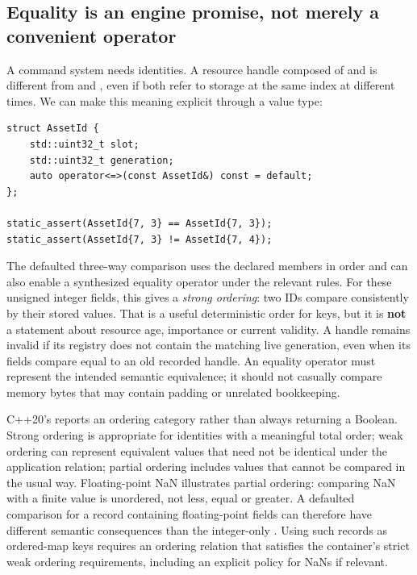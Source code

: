 \subsection{Equality is an engine promise, not merely a convenient operator}\label{05-engine-i-ch004-equality-is-an-engine-promise-not-merely-a-convenient-operator}

\hypertarget{05-engine-i-ch004-equality-is-an-engine-promise-not-merely-a-convenient-operator}{}

A command system needs identities. A resource handle composed of  and  is different from  and , even if both refer to storage at the same index at different times. We can make this meaning explicit through a value type:

\begin{verbatim}
struct AssetId {
    std::uint32_t slot;
    std::uint32_t generation;
    auto operator<=>(const AssetId&) const = default;
};

static_assert(AssetId{7, 3} == AssetId{7, 3});
static_assert(AssetId{7, 3} != AssetId{7, 4});
\end{verbatim}

The defaulted three-way comparison uses the declared members in order and can also enable a synthesized equality operator under the relevant rules. For these unsigned integer fields, this gives a \emph{strong ordering}: two IDs compare consistently by their stored values. That is a useful deterministic order for keys, but it is \textbf{not} a statement about resource age, importance or current validity. A handle remains invalid if its registry does not contain the matching live generation, even when its fields compare equal to an old recorded handle. An equality operator must represent the intended semantic equivalence; it should not casually compare memory bytes that may contain padding or unrelated bookkeeping.

C++20's \BookInlineCode{{\textless{}}{=}{\textgreater{}}}{\textless{}=\textgreater{}} reports an ordering category rather than always returning a Boolean. Strong ordering is appropriate for identities with a meaningful total order; weak ordering can represent equivalent values that need not be identical under the application relation; partial ordering includes values that cannot be compared in the usual way. Floating-point NaN illustrates partial ordering: comparing NaN with a finite value is unordered, not less, equal or greater. A defaulted comparison for a record containing floating-point fields can therefore have different semantic consequences than the integer-only . Using such records as ordered-map keys requires an ordering relation that satisfies the container's strict weak ordering requirements, including an explicit policy for NaNs if relevant.

